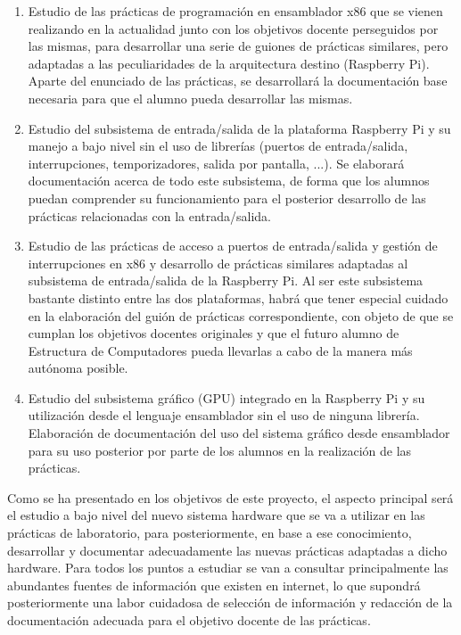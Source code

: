 \begin{enumerate}
  \item Estudio de las prácticas de programación en ensamblador x86 que se vienen realizando
        en la actualidad junto con los objetivos docente perseguidos por las mismas, para
        desarrollar una serie de guiones de prácticas similares, pero adaptadas a las
        peculiaridades de la arquitectura destino (Raspberry Pi). Aparte del enunciado
        de las prácticas, se desarrollará la documentación base necesaria para que el
        alumno pueda desarrollar las mismas.
  \item Estudio del subsistema de entrada/salida de la plataforma Raspberry Pi y su manejo
        a bajo nivel sin el uso de librerías (puertos de entrada/salida, interrupciones,
        temporizadores, salida por pantalla, ...). Se elaborará documentación acerca de todo
        este subsistema, de forma que los alumnos puedan comprender su funcionamiento para
        el posterior desarrollo de las prácticas relacionadas con la entrada/salida. 
  \item Estudio de las prácticas de acceso a puertos de entrada/salida y gestión de
        interrupciones en x86 y desarrollo de prácticas similares adaptadas al subsistema
        de entrada/salida de la Raspberry Pi. Al ser este subsistema bastante distinto
        entre las dos plataformas, habrá que tener especial cuidado en la elaboración del
        guión de prácticas correspondiente, con objeto de que se cumplan los objetivos
        docentes originales y que el futuro alumno de Estructura de Computadores pueda
        llevarlas a cabo de la manera más autónoma posible.
  \item Estudio del subsistema gráfico (GPU) integrado en la Raspberry Pi y su utilización
        desde el lenguaje ensamblador sin el uso de ninguna librería. Elaboración de
        documentación del uso del sistema gráfico desde ensamblador para su uso posterior
        por parte de los alumnos en la realización de las prácticas. 
\end{enumerate}

Como se ha presentado en los objetivos de este proyecto, el aspecto principal será el
estudio a bajo nivel del nuevo sistema hardware que se va a utilizar en las prácticas
de laboratorio, para posteriormente, en base a ese conocimiento, desarrollar y
documentar adecuadamente las nuevas prácticas adaptadas a dicho hardware. Para todos
los puntos a estudiar se van a consultar principalmente las abundantes fuentes de
información que existen en internet, lo que supondrá posteriormente una labor
cuidadosa de selección de información y redacción de la documentación adecuada para
el objetivo docente de las prácticas.

